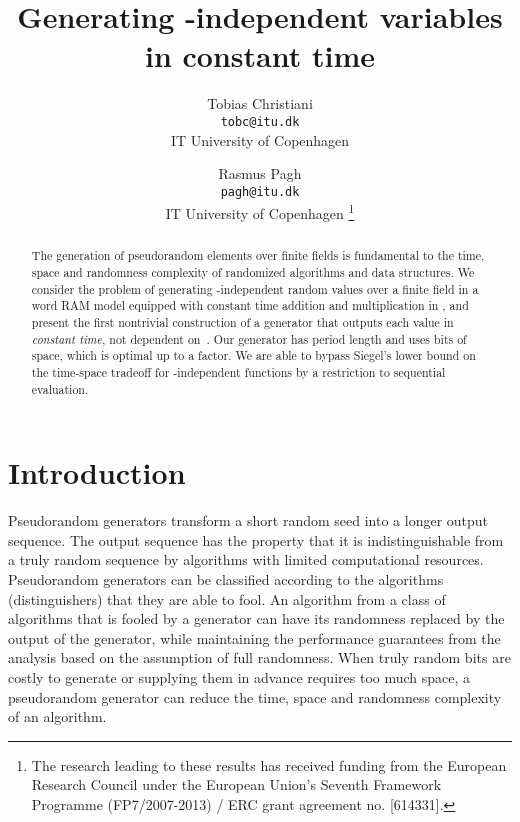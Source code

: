 \documentclass[a4paper,11pt]{article}
\theoremstyle{plain}
\theoremstyle{definition}
\begin{document}
\title{Generating -independent variables in constant time}

\author{
	Tobias Christiani\\
	\small \texttt{tobc@itu.dk}\\
	\small IT University of Copenhagen
	\and
	Rasmus Pagh\\
	\small \texttt{pagh@itu.dk}\\
	\small IT University of Copenhagen
\thanks{The research leading to these results has received funding from the European Research Council under the European Union's Seventh Framework Programme (FP7/2007-2013) / ERC grant agreement no. [614331].}
}

\renewcommand\footnotemark{}

\date{\vspace{-5ex}}

\maketitle

\begin{abstract}
The generation of pseudorandom elements over finite fields is fundamental to the time, space and randomness complexity of randomized algorithms and data structures. 
We consider the problem of generating -independent random values over a finite field  in a word RAM model equipped with constant time addition and multiplication in , and present the first nontrivial construction of a generator that outputs each value in \emph{constant time}, not dependent on~.
Our generator has period length  and uses  bits of space, which is optimal up to a  factor.
We are able to bypass Siegel's lower bound on the time-space tradeoff for \mbox{-independent} functions by a restriction to sequential evaluation.  
\end{abstract}

\section{Introduction}
Pseudorandom generators transform a short random seed into a longer output sequence. 
The output sequence has the property that it is indistinguishable from a truly random sequence by algorithms with limited computational resources. 
Pseudorandom generators can be classified according to the algorithms (distinguishers) that they are able to fool.
An algorithm from a class of algorithms that is fooled by a generator can have its randomness replaced by the output of the generator,
while maintaining the performance guarantees from the analysis based on the assumption of full randomness.
When truly random bits are costly to generate or supplying them in advance requires too much space, a pseudorandom generator can reduce the time, space and randomness complexity of an algorithm.
\end{document}
